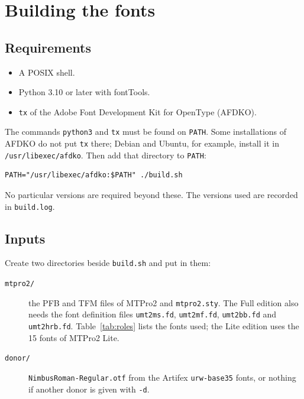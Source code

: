 \documentclass[10pt]{article}
\newcommand\file[1]{\texttt{#1}}
\newcommand\code[1]{\texttt{#1}}
\begin{document}
\section{Building the fonts}\label{sec:build}

\subsection{Requirements}

\begin{itemize}
\item A POSIX shell.
\item Python 3.10 or later with fontTools.
\item \code{tx} of the Adobe Font Development Kit for OpenType
  (AFDKO).
\end{itemize}

The commands \code{python3} and \code{tx} must be found on
\code{PATH}.  Some installations of AFDKO do not put \code{tx} there;
Debian and Ubuntu, for example, install it in
\file{/usr/libexec/afdko}.  Then add that directory to \code{PATH}:

\begin{verbatim}
PATH="/usr/libexec/afdko:$PATH" ./build.sh
\end{verbatim}

No particular versions are required beyond these.  The versions used
are recorded in \file{build.log}.

\subsection{Inputs}

Create two directories beside \file{build.sh} and put in them:

\begin{description}
\item[\file{mtpro2/}] the PFB and TFM files of MTPro2 and
  \file{mtpro2.sty}.  The Full edition also needs the font definition
  files \file{umt2ms.fd}, \file{umt2mf.fd}, \file{umt2bb.fd} and
  \file{umt2hrb.fd}.  Table~\ref{tab:roles} lists the fonts used; the
  Lite edition uses the 15 fonts of MTPro2 Lite.
\item[\file{donor/}] \file{NimbusRoman-Regular.otf} from the Artifex
  \code{urw-base35} fonts, or nothing if another donor is given with
  \code{-d}.
\end{description}
\end{document}
